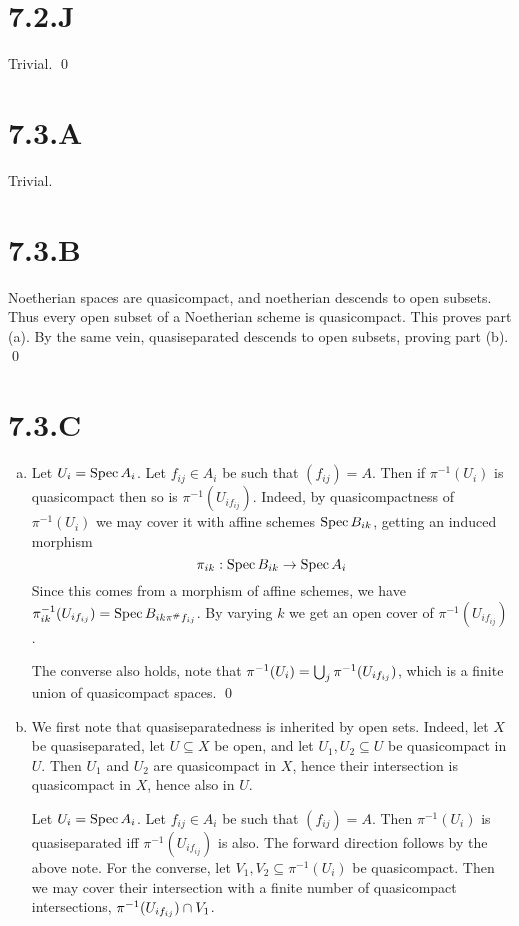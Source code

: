 \documentclass{article}
\begin{document}
\section{7.2.J}
Trivial. \qed

\section{7.3.A}
Trivial.

\section{7.3.B}
Noetherian spaces are quasicompact, and noetherian descends to open subsets.
Thus every open subset of a Noetherian scheme is quasicompact. This proves part
(a). By the same vein, quasiseparated descends to open subsets, proving part
(b). \qed

\section{7.3.C}
\begin{enumerate}[a.]
    \item Let $U_i=\operatorname{Spec} A_i$. Let $f_{ij} \in A_i$ be such that
          $(f_{ij})=A$. Then if $\pi^{-1}(U_i)$ is quasicompact then so
          is $\pi^{-1}(U_{if_{ij}})$. Indeed, by quasicompactness of
          $\pi^{-1}(U_i)$ we may cover it with affine schemes
          $\operatorname{Spec}
              B_{ik}$, getting an induced morphism \[\pi_{ik}: \operatorname{Spec} B_{ik} \to
              \operatorname{Spec} A_i\]
          Since this comes from a morphism of affine schemes, we have
          $\pi_{ik}^{-1}(U_{if_{ij}})=\operatorname{Spec} B_{ik\pi^{\#}f_{ij}}$. By varying $k$ we get an open cover
          of $\pi^{-1}(U_{if_{ij}})$.

          The converse also holds, note that $\pi^{-1}(U_i)=\bigcup_j
              \pi^{-1}(U_{if_{ij}})$, which is a finite
          union of quasicompact spaces. \qed
    \item We first note that quasiseparatedness is inherited by open sets. Indeed, let
          $X$ be quasiseparated, let $U \subseteq X$ be open,
          and let $U_1, U_2 \subseteq U$ be quasicompact in $U$. Then
          $U_1$ and $U_2$ are quasicompact in
          $X$, hence their intersection is quasicompact in
          $X$, hence also in $U$.

          Let $U_i=\operatorname{Spec} A_i$. Let $f_{ij} \in A_i$ be such that
          $(f_{ij})=A$. Then $\pi^{-1}(U_i)$ is quasiseparated iff
          $\pi^{-1}(U_{if_{ij}})$ is also. The forward direction follows by the above
          note. For the converse, let $V_1, V_2 \subseteq \pi^{-1}(U_i)$ be quasicompact. Then we may
          cover their intersection with a finite number of quasicompact intersections,
          $\pi^{-1}(U_{if_{ij}}) \cap V_1$.
\end{enumerate}
\end{document}
